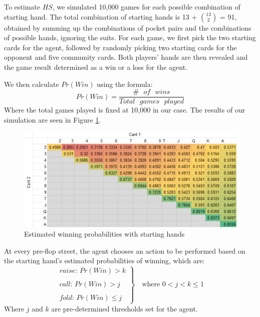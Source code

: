 \documentclass{article}
\begin{document}
To estimate $HS$, we simulated 10,000 games for each possible combination of starting hand. The total combination of starting hands is  13 + ${13 \choose 2}$ = 91, obtained by summing up the combinations of pocket pairs and the combinations of possible hands, ignoring the suits. For each game, we first pick the two starting cards for the agent, followed by randomly picking two starting cards for the opponent and five community cards. Both players' hands are then revealed and the game result determined as a win or a loss for the agent.

We then calculate $Pr(Win)$ using the formula:
\begin{displaymath}
Pr(Win)= \frac{\# \text{ } of \text{ } wins}{Total \text{ }games \text{ } played}
\end{displaymath}
Where the total games played is fixed at 10,000 in our case. The results of our simulation are seen in Figure \ref{fig:1}.
\begin{figure}
  \includegraphics[width=\linewidth]{WinningProb.PNG}
  \caption{Estimated winning probabilities with starting hands}
  \label{fig:1}
\end{figure}

At every pre-flop street, the agent chooses an action to be performed based on the starting hand's estimated probabilities of winning, which are:
\begin{displaymath}
  \left.
  \begin{array}{l}
    raise \text{: } Pr(Win) > k \\
    \\
    call \text{: } Pr(Win) > j \\
    \\
    fold \text{: } Pr(Win) \leq j
  \end{array}
  \right\rbrace \quad \text{where } 0 < j < k \leq 1
\end{displaymath}
Where $j$ and $k$ are pre-determined thresholds set for the agent.
\end{document}
